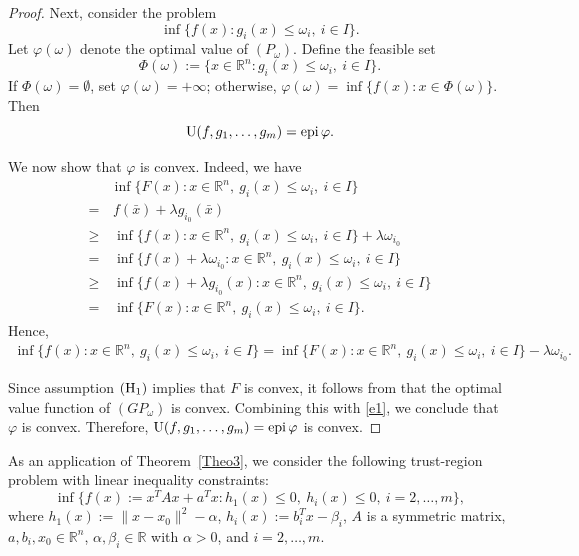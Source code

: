 \documentclass[]{interact}
\theoremstyle{plain}%
\theoremstyle{definition}
\theoremstyle{remark}
\begin{document}
\begin{proof}
		Next, consider the problem
		\begin{equation}\tag{$P_\omega$}
			\inf\{f(x): g_i(x)\leq \omega_i,\ i\in I\}.
		\end{equation}
		Let $\varphi(\omega)$ denote the optimal value of $(P_\omega)$.
		Define the feasible set
		$$
		\Phi(\omega):=\{x\in \mathbb{R}^n : g_i(x)\leq \omega_i,\ i\in I\}.
		$$
		If $\Phi(\omega)=\emptyset$, set $\varphi(\omega)=+\infty$; otherwise,
		$\varphi(\omega)=\inf\{f(x): x\in \Phi(\omega)\}$.
		Then
		$$
		{\rm U}(f,g_1,\ldots,g_m)={\rm epi}\,\varphi.
		$$
		
		We now show that $\varphi$ is convex.
		Indeed, we have
		\begin{align*}
			&\inf\{F(x): x\in \mathbb{R}^n,\ g_i(x)\leq \omega_i,\ i\in I\} \\
			=&\, f(\bar x)+\lambda g_{i_0}(\bar x) \\
			\geq&\, \inf\{f(x): x\in \mathbb{R}^n,\ g_i(x)\leq \omega_i,\ i\in I\}
			+\lambda \omega_{i_0} \\
			=&\, \inf\{f(x)+\lambda \omega_{i_0}: x\in \mathbb{R}^n,\ g_i(x)\leq \omega_i,\ i\in I\} \\
			\geq&\, \inf\{f(x)+\lambda g_{i_0}(x): x\in \mathbb{R}^n,\ g_i(x)\leq \omega_i,\ i\in I\} \\
			=&\, \inf\{F(x): x\in \mathbb{R}^n,\ g_i(x)\leq \omega_i,\ i\in I\}.
		\end{align*}
		Hence,
		\begin{align}
			\inf\{f(x): x\in \mathbb{R}^n,\ g_i(x)\leq \omega_i,\ i\in I\}
			=\inf\{F(x): x\in \mathbb{R}^n,\ g_i(x)\leq \omega_i,\ i\in I\}
			-\lambda \omega_{i_0}.
			\label{e1}
		\end{align}
		
		Since assumption ${\rm (H_1)}$ implies that $F$ is convex,
		it follows from \cite[Lemma~4.24]{Ruszczynski2006} that the optimal value function of $(GP_\omega)$
		is convex.
		Combining this with \eqref{e1}, we conclude that $\varphi$ is convex.
		Therefore, ${\rm U}(f,g_1,\ldots,g_m)={\rm epi}\,\varphi$ is convex.
	\end{proof}
	
	
	As an application of Theorem~\ref{Theo3}, we consider the following trust-region problem
	with linear inequality constraints:
	\begin{equation}\tag{$TP$}
		\inf\{f(x):=x^TAx+a^Tx : h_1(x)\leq 0,\ h_i(x)\leq 0,\ i=2,\ldots,m\},
	\end{equation}
	where $h_1(x):=\|x-x_0\|^2-\alpha$, $h_i(x):=b_i^Tx-\beta_i$,
	$A$ is a symmetric matrix,
	$a,b_i,x_0\in \mathbb{R}^n$,
	$\alpha,\beta_i\in \mathbb{R}$ with $\alpha>0$, and $i=2,\ldots,m$.
	
\end{document}
